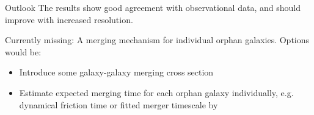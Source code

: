 \begin{frame}{Outlook}
    The results show good agreement with observational data, and should improve with increased resolution.
    
    Currently missing: A merging mechanism for individual orphan galaxies. Options would be:
    \begin{itemize}
        \item Introduce some galaxy-galaxy merging cross section
        \item Estimate expected merging time for each orphan galaxy individually, e.g. dynamical friction time or fitted merger timescale by \cite{merger_timescales}
    \end{itemize}
\end{frame}




